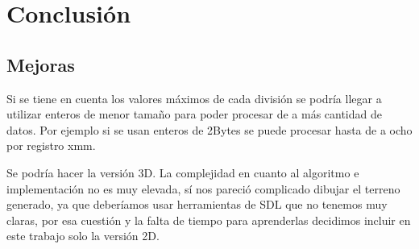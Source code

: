 \section{Conclusión}


\subsection{Mejoras}
Si se tiene en cuenta los valores máximos de cada división se podría llegar a utilizar enteros de menor tamaño para poder procesar de a más cantidad de datos. Por ejemplo si se usan enteros de 2Bytes se puede procesar hasta de a ocho por registro xmm.

Se podría hacer la versión 3D. La complejidad en cuanto al algoritmo e implementación no es muy elevada, sí nos pareció complicado dibujar el terreno generado, ya que deberíamos usar herramientas de SDL que no tenemos muy claras, por esa cuestión y la falta de tiempo para aprenderlas decidimos incluir en este trabajo solo la versión 2D.